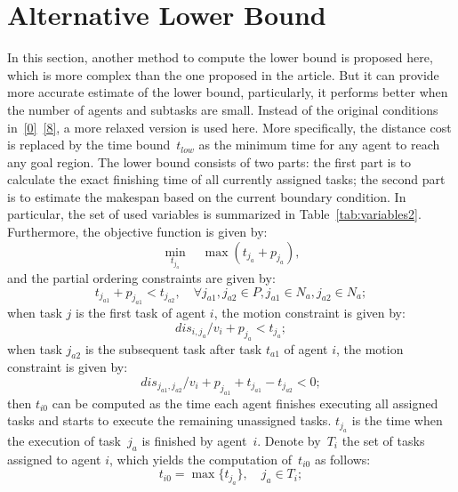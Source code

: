 \section{Alternative Lower Bound}
\label{lower bound method}
In this section,
another method to compute the lower bound is proposed here,
which is more complex than the one proposed in the article.
But it can provide more accurate estimate of the lower bound,
particularly, it performs better when the number of agents and subtasks are small.
Instead of the original conditions in~\eqref{0}~\eqref{8},
a more relaxed version is used here.
More specifically, the distance cost is replaced by the time bound~$t_{low}$
as the minimum time for any agent to reach any goal region.
The lower bound consists of two parts:
the first part is to calculate the exact finishing time of all currently assigned tasks;
the second part is to estimate the makespan based on the current boundary condition.
In particular,
the set of used variables is summarized in Table~\ref{tab:variables2}.
Furthermore, the objective function is given by:
$$ \min_{t_{j_a}} \quad \max(t_{j_a}+p_{j_a}),$$
and the partial ordering constraints are given by:
\begin{equation}
t_{j_{a1}} + p_{j_{a1}}< t_{j_{a2}},   \quad \forall j_{a1}, j_{a2} \in P , j_{a1} \in N_a, j_{a2} \in N_a;
\label{9}
\end{equation}
when task $j$ is the first task of agent $i$, the motion constraint is given by:
\begin{equation}
dis_{i,j_a}/v_i+ p_{j_a}< t_{j_a};
\label{10}
\end{equation}
when task $j_{a2}$ is the subsequent task after task $t_{a1}$ of agent $i$,
the motion constraint is given by:
\begin{equation}
dis_{j_{a1},j_{a2}}/v_i+ p_{j_{a1}}+t_{j_{a1}}- t_{j_{a2}}<0;
\label{11}
\end{equation}
then $t_{i0}$ can be computed as the time each agent finishes
executing all assigned tasks
and starts to execute the remaining unassigned tasks.
$t_{j_a}$ is the time when the execution of task~$j_a$ is finished by agent~$i$.
Denote by~$T_i$ the set of tasks assigned to agent $i$, which yields the
computation of~$t_{i0}$ as follows:
\begin{equation}
t_{i0} = \max{\{t_{j_a}\}},    \quad {j_a}\in T_i;
\label{12}
\end{equation}

